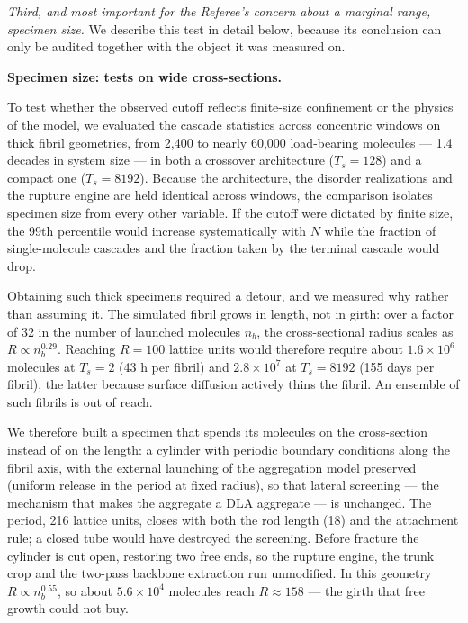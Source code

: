 \documentclass[11pt]{article}
\begin{document}
\textit{Third, and most important for the Referee's concern about a marginal
range, specimen size.} We describe this test in detail below, because its
conclusion can only be audited together with the object it was measured on.


\medskip
\textbf{Specimen size: tests on wide cross-sections.}


To test whether the observed cutoff reflects finite-size confinement or the
physics of the model, we evaluated the cascade statistics across concentric
windows on thick fibril geometries, from 2,400 to nearly 60,000 load-bearing
molecules --- 1.4 decades in system size --- in both a crossover architecture
($T_s=128$) and a compact one ($T_s=8192$). Because the architecture, the
disorder realizations and the rupture engine are held identical across windows,
the comparison isolates specimen size from every other variable. If the cutoff
were dictated by finite size, the 99th percentile would increase systematically
with $N$ while the fraction of single-molecule cascades and the fraction taken
by the terminal cascade would drop.

Obtaining such thick specimens required a detour, and we measured why rather
than assuming it. The simulated fibril grows in length, not in girth: over a
factor of 32 in the number of launched molecules $n_b$, the cross-sectional
radius scales as $R\propto n_b^{0.29}$. Reaching $R=100$ lattice units would
therefore require about $1.6\times10^{6}$ molecules at $T_s=2$ (43 h per fibril)
and $2.8\times10^{7}$ at $T_s=8192$ (155 days per fibril), the latter because
surface diffusion actively thins the fibril. An ensemble of such fibrils is out
of reach.

We therefore built a specimen that spends its molecules on the cross-section
instead of on the length: a cylinder with periodic boundary conditions along the
fibril axis, with the external launching of the aggregation model preserved
(uniform release in the period at fixed radius), so that lateral screening ---
the mechanism that makes the aggregate a DLA aggregate --- is unchanged. The
period, 216 lattice units, closes with both the rod length (18) and the
attachment rule; a closed tube would have destroyed the screening. Before
fracture the cylinder is cut open, restoring two free ends, so the rupture
engine, the trunk crop and the two-pass backbone extraction run unmodified. In
this geometry $R\propto n_b^{0.55}$, so about $5.6\times10^{4}$ molecules reach
$R\approx158$ --- the girth that free growth could not buy.
\end{document}
